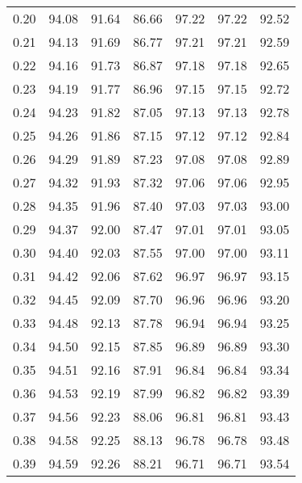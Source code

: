 \begin{tabular}{|c|c|c|c|c|c|c|}
      0.20 &     94.08 &     91.64 &      86.66 &   97.22 &      97.22 &         92.52 \\
      0.21 &     94.13 &     91.69 &      86.77 &   97.21 &      97.21 &         92.59 \\
      0.22 &     94.16 &     91.73 &      86.87 &   97.18 &      97.18 &         92.65 \\
      0.23 &     94.19 &     91.77 &      86.96 &   97.15 &      97.15 &         92.72 \\
      0.24 &     94.23 &     91.82 &      87.05 &   97.13 &      97.13 &         92.78 \\
      0.25 &     94.26 &     91.86 &      87.15 &   97.12 &      97.12 &         92.84 \\
      0.26 &     94.29 &     91.89 &      87.23 &   97.08 &      97.08 &         92.89 \\
      0.27 &     94.32 &     91.93 &      87.32 &   97.06 &      97.06 &         92.95 \\
      0.28 &     94.35 &     91.96 &      87.40 &   97.03 &      97.03 &         93.00 \\
      0.29 &     94.37 &     92.00 &      87.47 &   97.01 &      97.01 &         93.05 \\
      0.30 &     94.40 &     92.03 &      87.55 &   97.00 &      97.00 &         93.11 \\
      0.31 &     94.42 &     92.06 &      87.62 &   96.97 &      96.97 &         93.15 \\
      0.32 &     94.45 &     92.09 &      87.70 &   96.96 &      96.96 &         93.20 \\
      0.33 &     94.48 &     92.13 &      87.78 &   96.94 &      96.94 &         93.25 \\
      0.34 &     94.50 &     92.15 &      87.85 &   96.89 &      96.89 &         93.30 \\
      0.35 &     94.51 &     92.16 &      87.91 &   96.84 &      96.84 &         93.34 \\
      0.36 &     94.53 &     92.19 &      87.99 &   96.82 &      96.82 &         93.39 \\
      0.37 &     94.56 &     92.23 &      88.06 &   96.81 &      96.81 &         93.43 \\
      0.38 &     94.58 &     92.25 &      88.13 &   96.78 &      96.78 &         93.48 \\
      0.39 &     94.59 &     92.26 &      88.21 &   96.71 &      96.71 &         93.54 \\

\end{tabular}
